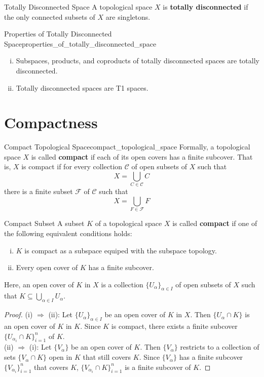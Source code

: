 \documentclass{report}
\begin{document}
\begin{definition}{Totally Disconnected Space}{}
	A topological space $X$ is \textbf{totally disconnected} if the only connected subsets of $X$ are singletons.
\end{definition}

\begin{proposition}{Properties of Totally Disconnected Space}{properties_of_totally_disconnected_space}
	\begin{enumerate}[(i)]
		\item Subspaces, products, and coproducts of totally disconnected spaces are totally disconnected.
	
		\item Totally disconnected spaces are T1 spaces.
	\end{enumerate}
\end{proposition}

\section{Compactness}
\begin{definition}{Compact Topological Space}{compact_topological_space}
	Formally, a topological space $X$ is called \textbf{compact} if each of its open covers has a finite subcover. That is, $X$ is compact if for every collection $\mathcal{C}$ of open subsets of $X$ such that
	\[
		X=\bigcup_{C \in \mathcal{C}} C
	\]
	there is a finite subset $\mathcal{F}$ of $\mathcal{C}$ such that
	\[
		X=\bigcup_{F \in \mathcal{F}} F
	\]
\end{definition}

\begin{definition}{Compact Subset}{}
	A subset $K$ of a topological space $X$ is called \textbf{compact} if one of the following equivalent conditions holds:

	\begin{enumerate}[(i)]
		\item $K$ is compact as a subspace equiped with the subspace topology.
		\item Every open cover of $K$ has a finite subcover.
	\end{enumerate}

	Here, an open cover of $K$ in $X$ is a collection $\{U_\alpha\}_{\alpha\in I}$ of open subsets of $X$ such that $K\subseteq \bigcup_{\alpha\in I}U_\alpha$. 
\end{definition}

\begin{proof}
	(i) $\Rightarrow$ (ii): Let $\{U_\alpha\}_{\alpha\in I
	}$ be an open cover of $K$ in $X$. Then $\{U_\alpha\cap K\}$ is an open cover of $K$ in $K$. Since $K$ is compact, there exists a finite subcover $\{U_{\alpha_i}\cap K\}_{i=1}^n$ of $K$.\\
	(ii) $\Rightarrow$ (i): Let $\{V_\alpha\}$ be an open cover of $K$. Then $\{V_\alpha\}$ restricts to a collection of sets $\{V_\alpha\cap K\}$ open in $K$ that still covers $K$. Since $\{V_\alpha\}$ has a finite subcover $\{V_{\alpha_i}\}_{i=1}^n$ that covers $K$, $\{V_{\alpha_i}\cap K\}_{i=1}^n$ is a finite subcover of $K$.
\end{proof}
\end{document}
